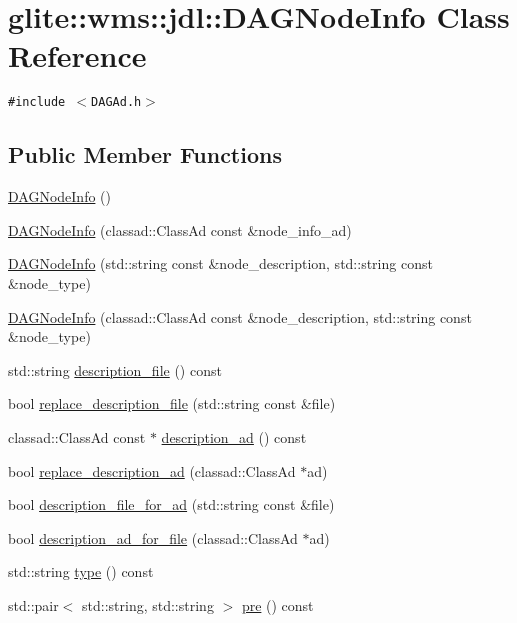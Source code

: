 \hypertarget{classglite_1_1wms_1_1jdl_1_1DAGNodeInfo}{
\section{glite::wms::jdl::DAGNode\-Info Class Reference}
\label{classglite_1_1wms_1_1jdl_1_1DAGNodeInfo}
}
{\tt \#include $<$DAGAd.h$>$}

\subsection*{Public Member Functions}
\begin{CompactItemize}
\item 
\hyperlink{classglite_1_1wms_1_1jdl_1_1DAGNodeInfo_a0}{DAGNode\-Info} ()
\item 
\hyperlink{classglite_1_1wms_1_1jdl_1_1DAGNodeInfo_a1}{DAGNode\-Info} (classad::Class\-Ad const \&node\_\-info\_\-ad)
\item 
\hyperlink{classglite_1_1wms_1_1jdl_1_1DAGNodeInfo_a2}{DAGNode\-Info} (std::string const \&node\_\-description, std::string const \&node\_\-type)
\item 
\hyperlink{classglite_1_1wms_1_1jdl_1_1DAGNodeInfo_a3}{DAGNode\-Info} (classad::Class\-Ad const \&node\_\-description, std::string const \&node\_\-type)
\item 
std::string \hyperlink{classglite_1_1wms_1_1jdl_1_1DAGNodeInfo_a4}{description\_\-file} () const 
\item 
bool \hyperlink{classglite_1_1wms_1_1jdl_1_1DAGNodeInfo_a5}{replace\_\-description\_\-file} (std::string const \&file)
\item 
classad::Class\-Ad const $\ast$ \hyperlink{classglite_1_1wms_1_1jdl_1_1DAGNodeInfo_a6}{description\_\-ad} () const 
\item 
bool \hyperlink{classglite_1_1wms_1_1jdl_1_1DAGNodeInfo_a7}{replace\_\-description\_\-ad} (classad::Class\-Ad $\ast$ad)
\item 
bool \hyperlink{classglite_1_1wms_1_1jdl_1_1DAGNodeInfo_a8}{description\_\-file\_\-for\_\-ad} (std::string const \&file)
\item 
bool \hyperlink{classglite_1_1wms_1_1jdl_1_1DAGNodeInfo_a9}{description\_\-ad\_\-for\_\-file} (classad::Class\-Ad $\ast$ad)
\item 
std::string \hyperlink{classglite_1_1wms_1_1jdl_1_1DAGNodeInfo_a10}{type} () const 
\item 
std::pair$<$ std::string, std::string $>$ \hyperlink{classglite_1_1wms_1_1jdl_1_1DAGNodeInfo_a11}{pre} () const 

\end{CompactItemize}
